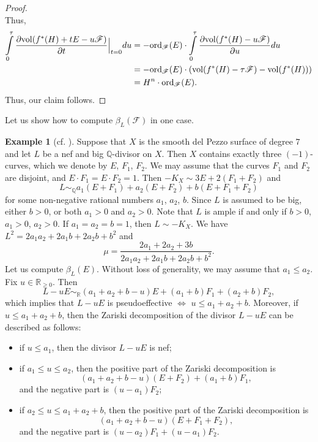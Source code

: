 \documentclass[12pt]{amsart}
\theoremstyle{definition}
\newtheorem{example}[theorem]{Example}
\theoremstyle{remark}
\begin{document}
\begin{proof}
$$$$
Thus,
$$\begin{aligned}
\int\limits_0^\tau \frac {\partial {\rm vol}(f^*(H)+tE-u\mathscr{F})  }{\partial t}\Big\vert_{t=0}du&= -{\rm ord}_\mathscr{F}(E) \cdot \int\limits_0^\tau \frac {\partial {\rm vol}(f^*(H)-u\mathscr{F})  }{\partial u}du\\
&=  -{\rm ord}_\mathscr{F}(E)\cdot ({\rm vol}(f^*(H)-\tau \mathscr{F})-{\rm vol}(f^*(H)))\\
&= H^n\cdot {\rm ord}_\mathscr{F}(E).
\end{aligned}
$$
Thus, our claim follows.
\end{proof}

Let us show how to compute $\beta_L(\mathscr{F})$ in one case.

\begin{example}[{cf.  \cite{CheltsovMartinez-Garcia}}]
\label{example:F1-dP7}
Suppose that $X$ is the smooth del Pezzo surface of degree $7$ and let $L$ be a nef and big $\mathbb Q$-divisor on $X$. Then $X$ contains exactly three $(-1)$-curves, which we denote by $E$, $F_1$, $F_2$.
We may assume that the curves $F_1$ and $F_2$ are disjoint, and $E\cdot F_1=E\cdot F_2=1$.
Then $-K_X\sim 3E+2(F_1+F_2)$ and
$$
L\sim_{\mathbb{Q}} a_1(E+F_1)+a_2(E+F_2)+b(E+F_1+F_2)
$$
for some non-negative rational numbers $a_1$, $a_2$, $b$. Since $L$ is assumed to be big, either $b>0$, or both $a_1>0$ and $a_2>0$. Note that $L$ is ample if and only if $b>0$, $a_1>0$, $a_2>0$. If $a_1=a_2=b=1$, then $L\sim -K_X$. We have $L^2=2a_1a_2+2a_1b+2a_2b+b^2$ and
$$
\mu=\frac{2a_1+2a_2+3b}{2a_1a_2+2a_1b+2a_2b+b^2}.
$$
Let us compute $\beta_L(E)$. Without loss of generality, we may assume that $a_1\leqslant a_2$. Fix $u\in\mathbb{R}_{\geqslant 0}$. Then
$$
L-uE\sim_{\mathbb{R}} (a_1+a_2+b-u)E+(a_1+b)F_1+(a_2+b)F_2,
$$
which implies that $L-uE$ is pseudoeffective $\iff$ $u\leqslant a_1+a_2+b$.
Moreover, if $u\leqslant a_1+a_2+b$, then the Zariski decomposition of the divisor $L-uE$ can be described as follows:
\begin{itemize}
\item if $u\leqslant a_1$, then the divisor $L-uE$ is nef;
\item if $a_1\leqslant u\leqslant a_2$, then the positive part of the Zariski decomposition is
$$
(a_1+a_2+b-u)(E+F_2)+(a_1+b)F_1,
$$
and the negative part is $(u-a_1)F_2$;
\item if $a_2\leqslant u\leqslant a_1+a_2+b$, then the positive part of the Zariski decomposition is
$$
(a_1+a_2+b-u)(E+F_1+F_2),
$$
and the negative part is $(u-a_2)F_1+(u-a_1)F_2$.

\end{itemize}
\end{example}
\end{document}
